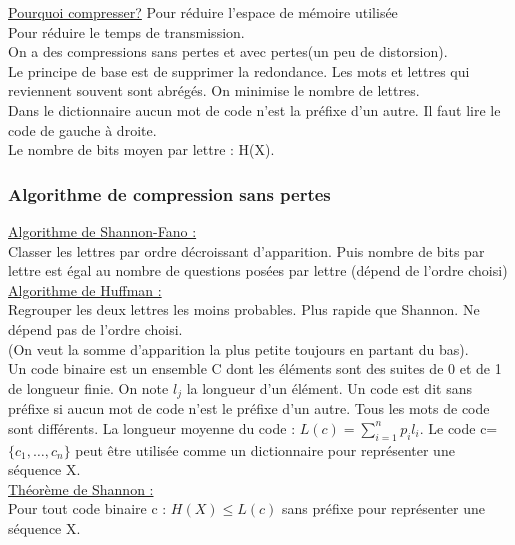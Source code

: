 \documentclass[../main.tex]{subfiles}
\begin{document}
\quad \underline{Pourquoi compresser?} Pour réduire l'espace de mémoire utilisée\\
Pour réduire le temps de transmission. \\

On a des compressions sans pertes et avec pertes(un peu de distorsion).\\

Le principe de base est de supprimer la redondance. Les mots et lettres qui reviennent souvent sont abrégés. On minimise le nombre de lettres.\\
\warning Dans le dictionnaire aucun mot de code n'est la préfixe d'un autre. Il faut lire le code de gauche à droite.\\

Le nombre de bits moyen par lettre : H(X).\\

\subsubsection{Algorithme de compression sans pertes}
\quad \underline{Algorithme de Shannon-Fano :}\\
Classer les lettres par ordre décroissant d'apparition. Puis nombre de bits par lettre est égal au nombre de questions posées par lettre (dépend de l'ordre choisi)\\

\quad \underline{Algorithme de Huffman :}\\
Regrouper les deux lettres les moins probables. Plus rapide que Shannon. Ne dépend pas de l'ordre choisi.\\
(On veut la somme d'apparition la plus petite toujours en partant du bas).\\

Un code binaire est un ensemble C dont les éléments sont des suites de 0 et de 1 de longueur finie. On note $l_j$ la longueur d'un élément. Un code est dit sans préfixe si aucun mot de code n'est le préfixe d'un autre. Tous les mots de code sont différents. La longueur moyenne du code : $L(c) = \sum_{i=1}^n p_il_i$. Le code c=$\{c_1, \dots, c_n\}$ peut être utilisée comme un dictionnaire pour représenter une séquence X.\\

\quad \underline{Théorème de Shannon :}\\
Pour tout code binaire c : $H(X) \leq L(c)$ sans préfixe pour représenter une séquence X.\\
\end{document}
